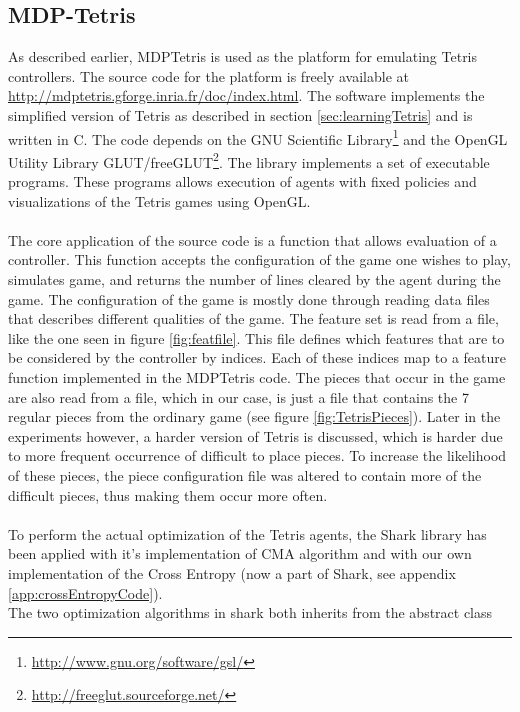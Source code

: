 \subsection{MDP-Tetris \label{sec:MDPTetris}}

As described earlier, MDPTetris is used as the 
platform for emulating Tetris controllers. The source code for the 
platform is freely available at \url{http://mdptetris.gforge.inria.fr/doc/index.html}.
The software implements the simplified version of Tetris as described in 
section \ref{sec:learningTetris} and is written in C. The code depends on
the GNU Scientific Library\footnote{\url{http://www.gnu.org/software/gsl/}} and
the OpenGL Utility 
Library GLUT/freeGLUT\footnote{\url{http://freeglut.sourceforge.net/}}.
The library implements a set of executable programs. These programs 
allows execution of agents with fixed policies and visualizations
of the Tetris games using OpenGL.\\
\\
The core application of the source code is a function that allows evaluation of 
a controller. This function accepts the configuration of the game one wishes to play,
simulates game, and returns the number of lines cleared by the agent during the game.
The configuration of the game is mostly done through reading data files that describes 
different qualities of the game. The feature set is read from a file,
like the one seen in figure \ref{fig:featfile}. This file defines which features that are to be 
considered by the controller by indices. Each of these indices map to a feature function 
implemented in the MDPTetris code. The pieces that occur in the game are also read from a file,
which in our case, is just a file that contains the 7 regular pieces from the ordinary game
(see figure \ref{fig:TetrisPieces}). Later in the experiments however, a harder version of Tetris
is discussed, which is harder due to more frequent occurrence of difficult to place pieces.
To increase the likelihood of these pieces, the piece configuration file was altered to
contain more of the difficult pieces, thus making them occur more often.\\
\\
To perform the actual optimization of the Tetris agents, the Shark library has been applied
with it's implementation of CMA algorithm and with our own implementation of the Cross Entropy (now a part of Shark,
see appendix \ref{app:crossEntropyCode}).\\
The two optimization algorithms in shark both inherits from the abstract class\\ 
